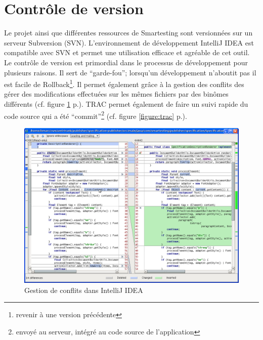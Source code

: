 \section{Contrôle de version}
Le projet ainsi que différentes ressources de Smartesting sont versionnées sur un serveur Subversion (SVN). L'environnement de développement IntelliJ IDEA est compatible avec SVN et permet une utilisation efficace et agréable de cet outil. Le contrôle de version est primordial dans le processus de développement pour plusieurs raisons. Il sert de ``garde-fou''; lorsqu'un développement n'aboutit pas il est facile de Rollback\footnote{revenir à une version précédente}. Il permet également grâce à la gestion des conflits des gérer des modifications effectuées sur les mêmes fichiers par des binômes différents (cf. figure \ref{figure:ideaMerge} p.\pageref{figure:ideaMerge}). TRAC permet également de faire un suivi rapide du code source qui a été ``commit''\footnote{envoyé au serveur, intégré au code source de l'application} (cf. figure \ref{figure:trac} p.\pageref{figure:trac}).
\begin{figure}[!ht]
\centering
\includegraphics[width=\textwidth]{Illustrations/ideaMerge.png}
\caption{Gestion de conflits dans IntelliJ IDEA}
\label{figure:ideaMerge}
\end{figure}
